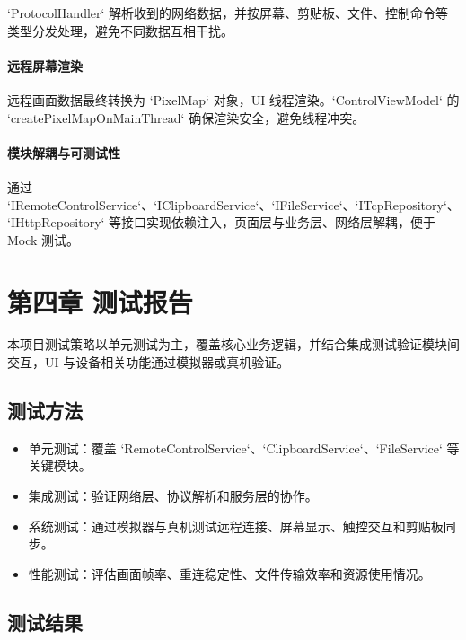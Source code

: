 \documentclass[12pt,a4paper]{article}
\begin{document}
`ProtocolHandler` 解析收到的网络数据，并按屏幕、剪贴板、文件、控制命令等类型分发处理，避免不同数据互相干扰。

\paragraph{远程屏幕渲染}

远程画面数据最终转换为 `PixelMap` 对象，UI 线程渲染。`ControlViewModel` 的 `createPixelMapOnMainThread` 确保渲染安全，避免线程冲突。

\paragraph{模块解耦与可测试性}

通过 `IRemoteControlService`、`IClipboardService`、`IFileService`、`ITcpRepository`、`IHttpRepository` 等接口实现依赖注入，页面层与业务层、网络层解耦，便于 Mock 测试。

\section{第四章 测试报告}

本项目测试策略以单元测试为主，覆盖核心业务逻辑，并结合集成测试验证模块间交互，UI 与设备相关功能通过模拟器或真机验证。

\subsection{测试方法}

\begin{itemize}
    \item 单元测试：覆盖 `RemoteControlService`、`ClipboardService`、`FileService` 等关键模块。
    \item 集成测试：验证网络层、协议解析和服务层的协作。
    \item 系统测试：通过模拟器与真机测试远程连接、屏幕显示、触控交互和剪贴板同步。
    \item 性能测试：评估画面帧率、重连稳定性、文件传输效率和资源使用情况。
\end{itemize}

\subsection{测试结果}
\end{document}

